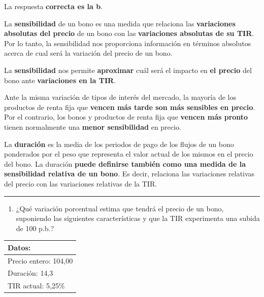 \documentclass[
  letterpaper,
  DIV=11,
  numbers=noendperiod]{scrreprt}
\providecommand{\tightlist}{%
  \setlength{\itemsep}{0pt}\setlength{\parskip}{0pt}}\usepackage{longtable,booktabs,array}
\begin{document}
\begin{tcolorbox}
\begin{tcolorbox}[enhanced jigsaw, toprule=.15mm, left=2mm, arc=.35mm, breakable, bottomrule=.15mm, opacityback=0, rightrule=.15mm, leftrule=.75mm, colframe=quarto-callout-note-color-frame, colback=white]
\begin{minipage}[t]{\textwidth - 5.5mm}
La respuesta \textbf{correcta es la b}.

La \textbf{sensibilidad} de un bono es una medida que relaciona las
\textbf{variaciones absolutas del precio} de un bono con las
\textbf{variaciones absolutas de su TIR}. Por lo tanto, la sensibilidad
nos proporciona información en términos absolutos acerca de cual será la
variación del precio de un bono.

La \textbf{sensibilidad} nos permite \textbf{aproximar} cuál será el
impacto en \textbf{el precio} del bono ante \textbf{variaciones en la
TIR}.

Ante la misma variación de tipos de interés del mercado, la mayoría de
los productos de renta fija que \textbf{vencen más tarde son más
sensibles en precio}. Por el contrario, los bonos y productos de renta
fija que \textbf{vencen más pronto} tienen normalmente una \textbf{menor
sensibilidad} en precio.

La \textbf{duración} es la media de los periodos de pago de los flujos
de un bono ponderados por el peso que representa el valor actual de los
mismos en el precio del bono. La duración \textbf{puede definirse
también como una medida de la sensibilidad relativa de un bono}. Es
decir, relaciona las variaciones relativas del precio con las
variaciones relativas de la TIR.

\end{minipage}%
\end{tcolorbox}

\begin{center}\rule{0.5\linewidth}{0.5pt}\end{center}

\begin{enumerate}
\def\labelenumi{\arabic{enumi}.}
\setcounter{enumi}{6}
\tightlist
\item
  ¿Qué variación porcentual estima que tendrá el precio de un bono,
  suponiendo las siguientes características y que la TIR experimenta una
  subida de 100 p.b.?
\end{enumerate}

\begin{longtable}[]{@{}l@{}}
\toprule\noalign{}
\textbf{Datos:} \\
\midrule\noalign{}
\endhead
\bottomrule\noalign{}
\endlastfoot
Precio entero: 104,00 \\
Duración: 14,3 \\
TIR actual: 5,25\% \\
\end{longtable}


\end{tcolorbox}
\end{document}
